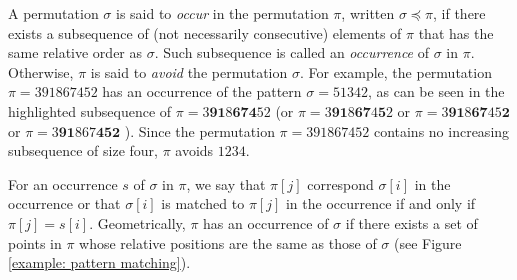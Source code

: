 \documentclass[a4paper]{llncs}
\begin{document}
A permutation $\sigma$ is said to \emph{occur} in the permutation $\pi$, written $\sigma \preceq \pi$,
if there exists a subsequence of (not necessarily consecutive)
elements of $\pi$ that has the same relative order as $\sigma$.
Such subsequence is called an \emph{occurrence} of $\sigma$ in $\pi$.
Otherwise, $\pi$ is said to \emph{avoid} the permutation $\sigma$.
For example, the permutation $\pi = 391867452$
has an occurrence of the pattern $\sigma = 51342$,
as can be seen in the highlighted subsequence of
$\pi = 3\mathbf{9}\mathbf{1}8\mathbf{6}\mathbf{7}\mathbf{4}52$
(or
$\pi = 3\mathbf{9}\mathbf{1}8\mathbf{6}\mathbf{7}4\mathbf{5}2$
or
$\pi = 3\mathbf{9}\mathbf{1}8\mathbf{6}\mathbf{7}45\textbf{2}$
or
$\pi = 3\mathbf{9}\mathbf{1}867\textbf{4}\textbf{5}\mathbf{2}$
).
Since the permutation $\pi = 391867452$  contains no increasing subsequence of
size four, $\pi$ avoids $1234$.

For an occurrence $s$ of $\sigma$ in $\pi$,
we say that $\pi[j]$ correspond $\sigma[i]$ in the occurrence or
that $\sigma[i]$ is matched to $\pi[j]$  in the occurrence
if and only if $\pi[j]=s[i]$.
Geometrically, $\pi$ has an occurrence of $\sigma$ if there exists
a set of points in $\pi$ whose relative positions are the same as those of $\sigma$
(see Figure \ref{example: pattern matching}).
\end{document}
